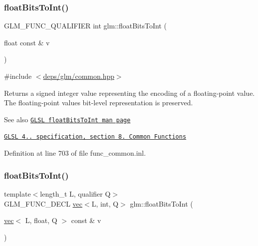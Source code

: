 \mbox{\label{group__core__func__common_gadc6a536a7bef046c3293d2ccad6d9ca2}} 
\subsubsection{\texorpdfstring{float\+Bits\+To\+Int()}{floatBitsToInt()}\hspace{0.1cm}{\footnotesize\ttfamily [1/2]}}
{\footnotesize\ttfamily G\+L\+M\+\_\+\+F\+U\+N\+C\+\_\+\+Q\+U\+A\+L\+I\+F\+I\+ER int glm\+::float\+Bits\+To\+Int (\begin{DoxyParamCaption}\item[{float const \&}]{v }\end{DoxyParamCaption})}



{\ttfamily \#include $<$\hyperlink{common_8hpp}{deps/glm/common.\+hpp}$>$}

Returns a signed integer value representing the encoding of a floating-\/point value. The floating-\/point value\textquotesingle{}s bit-\/level representation is preserved.

\begin{DoxySeeAlso}{See also}
\href{http://www.opengl.org/sdk/docs/manglsl/xhtml/floatBitsToInt.xml}{\tt G\+L\+SL float\+Bits\+To\+Int man page} 

\href{http://www.opengl.org/registry/doc/GLSLangSpec.4.20.8.pdf}{\tt G\+L\+SL 4.. specification, section 8. Common Functions} 
\end{DoxySeeAlso}


Definition at line 703 of file func\+\_\+common.\+inl.

\mbox{\label{group__core__func__common_ga99f7d62f78ac5ea3b49bae715c9488ed}} 
\subsubsection{\texorpdfstring{float\+Bits\+To\+Int()}{floatBitsToInt()}\hspace{0.1cm}{\footnotesize\ttfamily [2/2]}}
{\footnotesize\ttfamily template$<$length\+\_\+t L, qualifier Q$>$ \\
G\+L\+M\+\_\+\+F\+U\+N\+C\+\_\+\+D\+E\+CL \hyperlink{structglm_1_1vec}{vec}$<$L, int, Q$>$ glm\+::float\+Bits\+To\+Int (\begin{DoxyParamCaption}\item[{\hyperlink{structglm_1_1vec}{vec}$<$ L, float, Q $>$ const \&}]{v }\end{DoxyParamCaption})}




